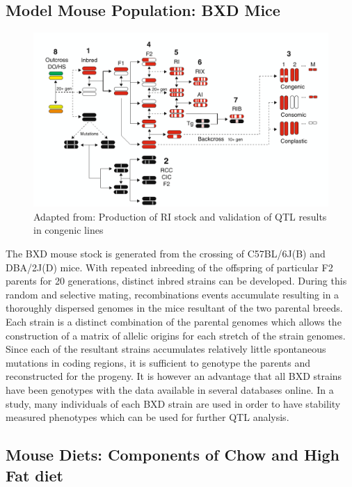 \documentclass[a4paper]{book}
\begin{document}
	\subsection{Model Mouse Population: BXD Mice}
	
	\begin{figure}
		\centering
		\includegraphics[width=\linewidth]{1.Introduction_Figures/BXDs.png}
		\caption{Adapted from:\citep{Williams2017ResourcesGenetics} Production of RI stock and validation of QTL results in congenic lines}
	\end{figure}
	
	The BXD mouse stock is generated from the crossing of C57BL/6J(B) and DBA/2J(D) mice. With repeated inbreeding of the offspring of particular F2 parents for 20 generations, distinct inbred strains can be developed. During this random and selective mating, recombinations events accumulate resulting in a thoroughly dispersed genomes in the mice resultant of the two parental breeds. Each strain is a distinct combination of the parental genomes which allows the construction of a matrix of allelic origins for each stretch of the strain genomes. Since each of the resultant strains accumulates relatively little spontaneous mutations in coding regions, it is sufficient to genotype the parents and reconstructed for the progeny. It is however an advantage that all BXD strains have been genotypes with the data available in several databases online.  In a study, many individuals of each BXD strain are used in order to have stability measured phenotypes which can be used for further QTL analysis. 
	
	\subsection{Mouse Diets: Components of Chow and High Fat diet}
	
\end{document}
